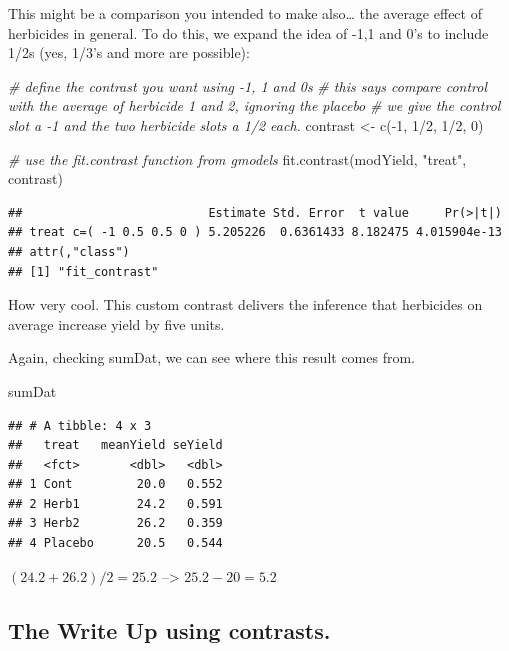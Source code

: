 \documentclass[
]{book}
\newenvironment{Shaded}{\begin{snugshade}}{\end{snugshade}}
\newcommand{\CommentTok}[1]{\textcolor[rgb]{0.56,0.35,0.01}{\textit{#1}}}
\newcommand{\DecValTok}[1]{\textcolor[rgb]{0.00,0.00,0.81}{#1}}
\newcommand{\FunctionTok}[1]{\textcolor[rgb]{0.00,0.00,0.00}{#1}}
\newcommand{\NormalTok}[1]{#1}
\newcommand{\OtherTok}[1]{\textcolor[rgb]{0.56,0.35,0.01}{#1}}
\newcommand{\SpecialCharTok}[1]{\textcolor[rgb]{0.00,0.00,0.00}{#1}}
\newcommand{\StringTok}[1]{\textcolor[rgb]{0.31,0.60,0.02}{#1}}
\begin{document}
This might be a comparison you intended to make also\ldots{} the average effect of herbicides in general. To do this, we expand the idea of -1,1 and 0's to include 1/2s (yes, 1/3's and more are possible):

\begin{Shaded}
\begin{Highlighting}[]
\CommentTok{\# define the contrast you want using {-}1, 1 and 0\textquotesingle{}s}
\CommentTok{\# this says compare control with the average of herbicide 1 and 2, ignoring the placebo}
\CommentTok{\# we give the control slot a {-}1 and the two herbicide slots a 1/2 each.}
\NormalTok{contrast }\OtherTok{\textless{}{-}} \FunctionTok{c}\NormalTok{(}\SpecialCharTok{{-}}\DecValTok{1}\NormalTok{, }\DecValTok{1}\SpecialCharTok{/}\DecValTok{2}\NormalTok{, }\DecValTok{1}\SpecialCharTok{/}\DecValTok{2}\NormalTok{, }\DecValTok{0}\NormalTok{)}

\CommentTok{\# use the fit.contrast function from gmodels}
\FunctionTok{fit.contrast}\NormalTok{(modYield, }\StringTok{"treat"}\NormalTok{, contrast)}
\end{Highlighting}
\end{Shaded}

\begin{verbatim}
##                          Estimate Std. Error  t value     Pr(>|t|)
## treat c=( -1 0.5 0.5 0 ) 5.205226  0.6361433 8.182475 4.015904e-13
## attr(,"class")
## [1] "fit_contrast"
\end{verbatim}

How very cool. This custom contrast delivers the inference that herbicides on average increase yield by five units.

Again, checking sumDat, we can see where this result comes from.

\begin{Shaded}
\begin{Highlighting}[]
\NormalTok{sumDat}
\end{Highlighting}
\end{Shaded}

\begin{verbatim}
## # A tibble: 4 x 3
##   treat   meanYield seYield
##   <fct>       <dbl>   <dbl>
## 1 Cont         20.0   0.552
## 2 Herb1        24.2   0.591
## 3 Herb2        26.2   0.359
## 4 Placebo      20.5   0.544
\end{verbatim}

\((24.2+26.2)/2 = 25.2\) --\textgreater{} \(25.2 - 20 = 5.2\)

\hypertarget{the-write-up-using-contrasts.}{%
\subsection{The Write Up using contrasts.}\label{the-write-up-using-contrasts.}}
\end{document}
